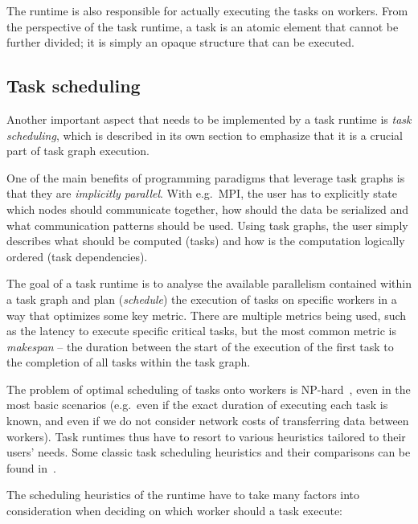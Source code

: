 The runtime is also responsible for actually executing the tasks on workers. From the
perspective of the task runtime, a task is an atomic element that cannot be further
divided; it is simply an opaque structure that can be executed.

\subsection{Task scheduling}
Another important aspect that needs to be implemented by a task runtime is \emph{task
scheduling}, which is described in its own section to emphasize that it is a crucial part of
task graph execution.

One of the main benefits of programming paradigms that leverage task graphs is that they are
\emph{implicitly parallel}. With e.g.\ MPI, the user has to explicitly state which nodes should
communicate together, how should the data be serialized and what communication patterns should
be used. Using task graphs, the user simply describes what should be computed (tasks) and how is
the computation logically ordered (task dependencies).

The goal of a task runtime is to analyse the available parallelism contained within a task graph
and plan (\emph{schedule}) the execution of tasks on specific workers in a way that
optimizes some key metric. There are multiple metrics being used, such as the latency to execute
specific critical tasks, but the most common metric is \emph{makespan} -- the duration between the
start of the execution of the first task to the completion of all tasks within the task graph.

The problem of optimal scheduling of tasks onto workers is NP-hard~\cite{Ullman1975}, even in
the most basic scenarios (e.g.\ even if the exact duration of executing each task is known,
and even if we do not consider network costs of transferring data between workers). Task
runtimes thus have to resort to various heuristics tailored to their users' needs. Some classic
task scheduling heuristics and their comparisons can be found
in~\cite{hlfet1974,kwok1998benchmarking,hagras2003static,wang2018list,estee}.

The scheduling heuristics of the runtime have to take many factors into consideration when
deciding on which worker should a task execute:

